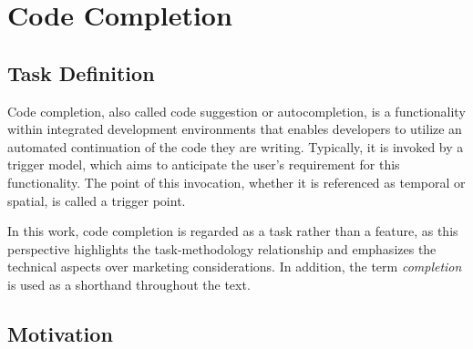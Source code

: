 \chapter{Code Completion}





\section{Task Definition}

Code completion, also called code suggestion or autocompletion, is a functionality within integrated development environments that enables developers to utilize an automated continuation of the code they are writing. Typically, it is invoked by a trigger model, which aims to anticipate the user's requirement for this functionality. The point of this invocation, whether it is referenced as temporal or spatial, is called a trigger point.

In this work, code completion is regarded as a task rather than a feature, as this perspective highlights the task-methodology relationship and emphasizes the technical aspects over marketing considerations. In addition, the term \textit{completion} is used as a shorthand throughout the text.

\section{Motivation}

